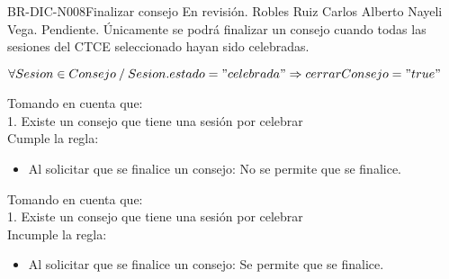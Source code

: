 \begin{BusinessRule}{BR-DIC-N008}{Finalizar consejo}
	{\bcAutorization}    %
	{\btEnabler}     %
	{\blControlling}    %
	\BRItem[Estado] En revisión.
	 Robles Ruiz Carlos Alberto
	 Nayeli Vega.
	 Pendiente.
	\BRItem[Descripción] Únicamente se podrá finalizar un consejo cuando todas las sesiones del CTCE seleccionado hayan sido celebradas.
	\BRItem[Sentencia] 
		\begin{itemize}
				$\forall Sesion \in Consejo  \: / \:  Sesion.estado="celebrada"  \Rightarrow cerrarConsejo="true"$
		\end{itemize}

	Tomando en cuenta que:\\
	1. Existe un consejo que tiene una sesión por celebrar\\ 
	Cumple la regla:
	\begin{itemize}
		\item Al solicitar que se finalice un consejo: No se permite que se finalice.
	\end{itemize}
	Tomando en cuenta que:\\
	1. Existe un consejo que tiene una sesión por celebrar\\ 
	Incumple la regla:
	\begin{itemize}
		\item Al solicitar que se finalice un consejo: Se permite que se finalice.
	\end{itemize}
\end{BusinessRule}

